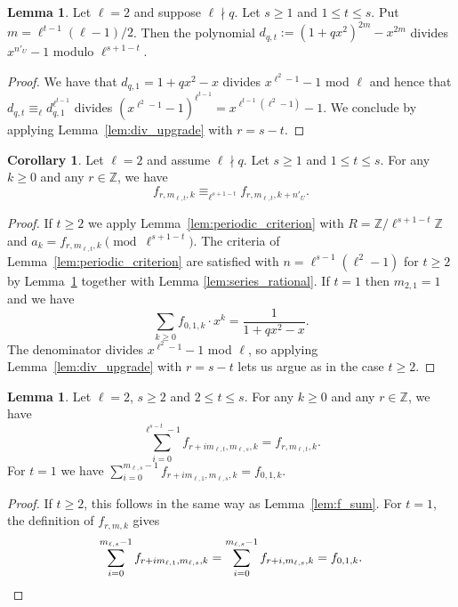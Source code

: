 \documentclass[10pt]{article}
\theoremstyle{definition}
\newtheorem{corollary}[theorem]{Corollary}
\newtheorem{lemma}[theorem]{Lemma}
\renewcommand{\:}{\colon}
\begin{document}
\begin{lemma}\label{lem:denom_divisible_even}
     Let $\ell =2$ and suppose $\ell \nmid q$.
     Let $s \geq 1$ and $1 \leq t \leq s$. Put $m = \ell^{t-1}(\ell-1)/2$. Then the polynomial $d_{q,t} := (1+qx^2)^{2m} - x^{2m}$ divides $x^{n'_{U}}-1$ modulo $\ell^{s+1-t}$.
\end{lemma}
\begin{proof}
    We have that $d_{q,1}=1+qx^2-x$ divides $x^{\ell^2-1}-1$ mod $\ell$ and hence that $d_{q,t} \equiv_{\ell} d_{q,1}^{\ell^{t-1}}$ divides $(x^{\ell^2-1}-1)^{\ell^{t-1}} = x^{\ell^{t-1}(\ell^2-1)}-1$.  
    We conclude by applying Lemma~\ref{lem:div_upgrade} with $r=s-t$.
\end{proof}

\begin{corollary}\label{cor:n_U_even}
    Let $\ell =2$ and assume $\ell \nmid q$.
     Let $s \geq 1$ and $1 \leq t \leq s$. 
     For any $k \geq 0$ and any $r \in \mathbb Z$, we have
    \[
    f_{r,m_{\ell,t},k} \equiv_{\ell^{s+1-t}} f_{r,m_{\ell,t},k+n'_U}.
    \]
\end{corollary}

\begin{proof}
    If $t \geq 2$ we apply Lemma~\ref{lem:periodic_criterion} with $R = \mathbb Z/\ell^{s+1-t}\mathbb Z$ and $a_k = f_{r,m_{\ell,t},k} \pmod{\ell^{s+1-t}}$. The criteria of Lemma~\ref{lem:periodic_criterion} are satisfied with $n = \ell^{s-1}(\ell^2-1)$ for $t\geq 2$ by Lemma~\ref{lem:denom_divisible_even} together with Lemma \ref{lem:series_rational}.
    If $t=1$ then $m_{2,1}=1$ and we have   
    \begin{equation} \label{eq-m21}
    \sum_{k \geq 0} f_{0,1,k} \cdot x^{k} = \frac{1}{1+qx^2-x}.
    \end{equation}
    The denominator divides $x^{\ell^2-1}-1$ mod $\ell$, so applying Lemma~\ref{lem:div_upgrade} with $r = s-t$ lets us argue as in the case $t \geq 2$.
\end{proof}

\begin{lemma}\label{lem:f_sum_even}
    Let $\ell=2$, $s \geq 2$ and $2 \leq t \leq s$. For any $k \geq 0$ and any $r \in \mathbb Z$, we have 
    \[
    \sum_{i=0}^{\ell^{s-t}-1} f_{r+im_{\ell,t},m_{\ell,s},k} = f_{r,m_{\ell,t},k}.
    \]
    For $t=1$ we have 
    $\sum_{i=0}^{m_{\ell,s}-1} f_{r+im_{\ell,1},m_{\ell,s},k} = f_{0,1,k}. $
\end{lemma}
\begin{proof}
    If $t \geq 2$, this follows in the same way as Lemma~\ref{lem:f_sum}. For $t=1$, the definition of $f_{r,m,k}$ gives 
        \[
    \sum_{i=0}^{m_{\ell,s}-1} f_{r+im_{\ell,1},m_{\ell,s},k}=\sum_{i=0}^{m_{\ell,s}-1} f_{r+i,m_{\ell,s},k}=f_{0,1,k}.\qedhere
    \]
\end{proof}
\end{document}
